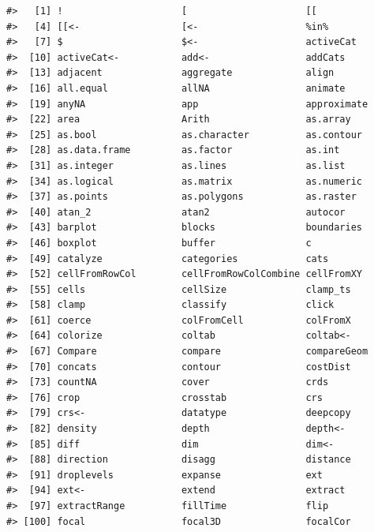 \documentclass[
]{book}
\begin{document}
\begin{verbatim}
#>   [1] !                     [                     [[                   
#>   [4] [[<-                  [<-                   %in%                 
#>   [7] $                     $<-                   activeCat            
#>  [10] activeCat<-           add<-                 addCats              
#>  [13] adjacent              aggregate             align                
#>  [16] all.equal             allNA                 animate              
#>  [19] anyNA                 app                   approximate          
#>  [22] area                  Arith                 as.array             
#>  [25] as.bool               as.character          as.contour           
#>  [28] as.data.frame         as.factor             as.int               
#>  [31] as.integer            as.lines              as.list              
#>  [34] as.logical            as.matrix             as.numeric           
#>  [37] as.points             as.polygons           as.raster            
#>  [40] atan_2                atan2                 autocor              
#>  [43] barplot               blocks                boundaries           
#>  [46] boxplot               buffer                c                    
#>  [49] catalyze              categories            cats                 
#>  [52] cellFromRowCol        cellFromRowColCombine cellFromXY           
#>  [55] cells                 cellSize              clamp_ts             
#>  [58] clamp                 classify              click                
#>  [61] coerce                colFromCell           colFromX             
#>  [64] colorize              coltab                coltab<-             
#>  [67] Compare               compare               compareGeom          
#>  [70] concats               contour               costDist             
#>  [73] countNA               cover                 crds                 
#>  [76] crop                  crosstab              crs                  
#>  [79] crs<-                 datatype              deepcopy             
#>  [82] density               depth                 depth<-              
#>  [85] diff                  dim                   dim<-                
#>  [88] direction             disagg                distance             
#>  [91] droplevels            expanse               ext                  
#>  [94] ext<-                 extend                extract              
#>  [97] extractRange          fillTime              flip                 
#> [100] focal                 focal3D               focalCor             

\end{verbatim}
\end{document}
